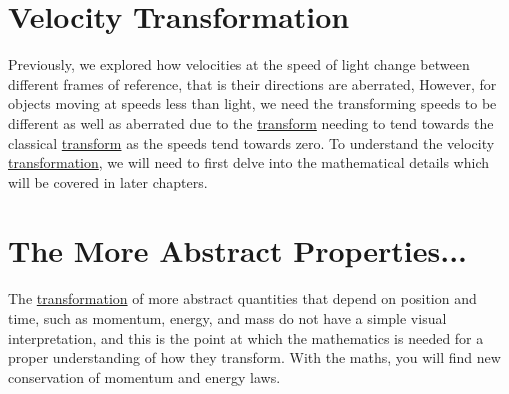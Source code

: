 \section{Velocity Transformation}

Previously, we explored how velocities at the speed of light change between different frames of reference, that is their directions are aberrated, However, for objects moving at speeds less than light, we need the transforming speeds to be different as well as aberrated due to the \hyperlink{def-transform}{transform} needing to tend towards the classical \hyperlink{def-transform}{transform} as the speeds tend towards zero. To understand the velocity \hyperlink{def-transform}{transformation}, we will need to first delve into the mathematical details which will be covered in later chapters.




\section{The More Abstract Properties...}%

The \hyperlink{def-transform}{transformation} of more abstract quantities that depend on position and time, such as momentum, energy, and mass do not have a simple visual interpretation, and this is the point at which the mathematics is needed for a proper understanding of how they transform. With the maths, you will find new conservation of momentum and energy laws.



